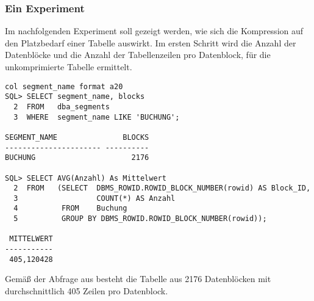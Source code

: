         \subsubsection{Ein Experiment}
          Im nachfolgenden Experiment soll gezeigt werden, wie sich die Kompression auf den Platzbedarf einer Tabelle auswirkt.
          Im ersten Schritt wird die Anzahl der Datenblöcke und die Anzahl der Tabellenzeilen pro Datenblock, für die unkomprimierte Tabelle  ermittelt.
          \begin{lstlisting}[caption={Anzahl der Datenblöcke + durchschnittliche Anzahl der Zeilen pro Block},label=admin307,language=oracle_sql,alsolanguage=sqlplus]
col segment_name format a20
SQL> SELECT segment_name, blocks
  2  FROM   dba_segments
  3  WHERE  segment_name LIKE 'BUCHUNG';

SEGMENT_NAME               BLOCKS
---------------------- ----------
BUCHUNG                      2176

SQL> SELECT AVG(Anzahl) As Mittelwert
  2  FROM   (SELECT  DBMS_ROWID.ROWID_BLOCK_NUMBER(rowid) AS Block_ID,
  3                  COUNT(*) AS Anzahl
  4          FROM    Buchung
  5          GROUP BY DBMS_ROWID.ROWID_BLOCK_NUMBER(rowid));

 MITTELWERT
-----------
 405,120428
          \end{lstlisting}
          Gemäß der Abfrage aus  besteht die Tabelle  aus 2176 Datenblöcken mit durchschnittlich 405 Zeilen pro Datenblock.

